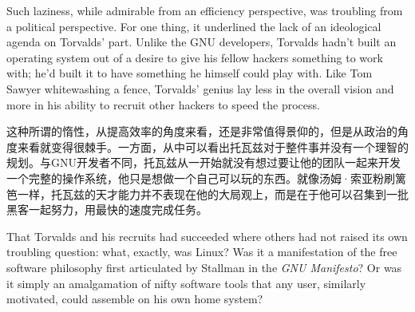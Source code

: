 \ifdefined\eng
Such laziness, while admirable from an efficiency perspective, was troubling from a political perspective. For one thing, it underlined the lack of an ideological agenda on Torvalds' part. Unlike the GNU developers, Torvalds hadn't built an operating system out of a desire to give his fellow hackers something to work with; he'd built it to have something he himself could play with. Like Tom Sawyer whitewashing a fence, Torvalds' genius lay less in the overall vision and more in his ability to recruit other hackers to speed the process.
\fi

\ifdefined\chs
这种所谓的惰性，从提高效率的角度来看，还是非常值得景仰的，但是从政治的角度来看就变得很棘手。一方面，从中可以看出托瓦兹对于整件事并没有一个理智的规划。与GNU开发者不同，托瓦兹从一开始就没有想过要让他的团队一起来开发一个完整的操作系统，他只是想做一个自己可以玩的东西。就像汤姆·索亚粉刷篱笆一样，托瓦兹的天才能力并不表现在他的大局观上，而是在于他可以召集到一批黑客一起努力，用最快的速度完成任务。
\fi

\ifdefined\eng
That Torvalds and his recruits had succeeded where others had not raised its own troubling question: what, exactly, was Linux? Was it a manifestation of the free software philosophy first articulated by Stallman in the \textit{GNU Manifesto}? Or was it simply an amalgamation of nifty software tools that any user, similarly motivated, could assemble on his own home system?
\fi

